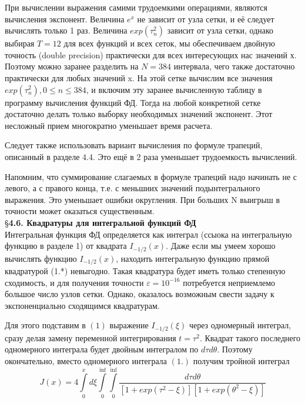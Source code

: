 При вычислении выражения самими трудоемкими операциями, являются вычисления экспонент. Величина $e^x$ не зависит от узла сетки, и её следует вычислять только 1 раз. Величина $exp(\tau_n^2)$ зависит от узла сетки, однако выбирая $T = 12$ для всех функций и всех сеток, мы обеспечиваем двойную точность (double precision) практически для всех интересующих нас значений х. Поэтому можно заранее разделить на $N = 384$ интервала, чего также достаточно практически для любых значений x. На этой сетке вычислим все значения $exp(\tau_n^2), 0 \leqslant n \leqslant 384$, и включим эту заранее вычисленную таблицу в программу вычисления функций ФД. Тогда на любой конкретной сетке достаточно делать только выборку необходимых значений экспонент. Этот несложный прием многократно уменьшает время расчета.

Следует также использовать вариант вычисления по формуле трапеций, описанный в разделе 4.4. Это ещё в 2 раза уменьшает трудоемкость вычислений.

Напомним, что суммирование слагаемых в формуле трапеций надо начинать не с левого, а с правого конца, т.е. с меньшиих значений подынтегрального выражения. Это уменьшает ошибки округления. При больших N выигрыш в точности может оказаться существенным.
\\

\S \textbf{4.6. Квадратуры для интегральной функций ФД}
\\

Интегральная функция ФД определяется как интеграл (ссыока на интегральную функцию в разделе 1) от квадрата $I_{-1/2}(x)$. Даже если мы умеем хорошо вычислять функцию $I_{-1/2}(x)$, находить интегральную функцию прямой квадратурой (1.*) невыгодно. Такая квадратура будет иметь только степенную сходимость, и для получения точности $\varepsilon = 10^{-16}$ потребуется неприемлемо большое число узлов сетки. Однако, оказалось возможным свести задачу к экспоненциально сходящимся квадратурам.

Для этого подставим в $(1)$ выражение $I_{-1/2}(\xi)$ через одномерный
интеграл, сразу делая замену переменной интегрирования $t=\tau^2$. Квадрат
такого последнего одномерного интеграла будет двойным интегралом по $d\tau d\theta$.
Поэтому окончательно, вместо одномерного интеграла $(1.)$ получим тройной
интеграл
\begin{equation}
J(x)=4 \int\limits_0^x d\xi \int\limits_0^{\inf} \int\limits_0^{\inf} \frac{d\tau d\theta}{[1+exp(\tau^2-\xi)][1+exp(\theta^2-\xi)]} 
\label{eq:ref_4_6_1}
\end{equation}

